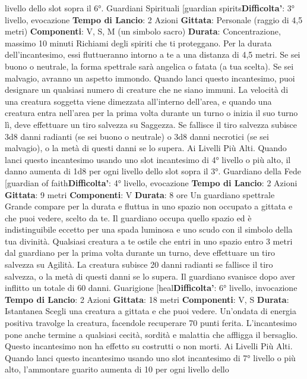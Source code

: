 \begin{multicols}{2}
livello dello slot sopra il 6°.
Guardiani Spirituali
[guardian spirits\textbf{Difficolta'}:
3° livello, evocazione
\textbf{Tempo di Lancio}: 2 Azioni
\textbf{Gittata}: Personale (raggio di 4,5 metri)
\textbf{Componenti}: V, S, M (un simbolo sacro)
\textbf{Durata}: Concentrazione, massimo 10 minuti
Richiami degli spiriti che ti proteggano. Per la durata
dell’incantesimo, essi fluttueranno intorno a te a una
distanza di 4,5 metri. Se sei buono o neutrale, la forma
spettrale sarà angelica o fatata (a tua scelta). Se sei
malvagio, avranno un aspetto immondo.
Quando lanci questo incantesimo, puoi designare un
qualsiasi numero di creature che ne siano immuni. La
velocità di una creatura soggetta viene dimezzata
all’interno dell’area, e quando una creatura entra
nell’area per la prima volta durante un turno o inizia il
suo turno lì, deve effettuare un tiro salvezza su
Saggezza. Se fallisce il tiro salvezza subisce 3d8 danni
radianti (se sei buono o neutrale) o 3d8 danni necrotici
(se sei malvagio), o la metà di questi danni se lo
supera.
Ai Livelli Più Alti. Quando lanci questo incantesimo
usando uno slot incantesimo di 4° livello o più alto, il
danno aumenta di 1d8 per ogni livello dello slot sopra il
3°.
Guardiano della Fede
[guardian of faith\textbf{Difficolta'}:
4° livello, evocazione
\textbf{Tempo di Lancio}: 2 Azioni
\textbf{Gittata}: 9 metri
\textbf{Componenti}: V
\textbf{Durata}: 8 ore
Un guardiano spettrale Grande compare per la durata e
fluttua in uno spazio non occupato a gittata e che puoi
vedere, scelto da te. Il guardiano occupa quello spazio
ed è indistinguibile eccetto per una spada luminosa e
uno scudo con il simbolo della tua divinità.
Qualsiasi creatura a te ostile che entri in uno spazio
entro 3 metri dal guardiano per la prima volta durante
un turno, deve effettuare un tiro salvezza su Agilità.
La creatura subisce 20 danni radianti se fallisce il tiro
salvezza, o la metà di questi danni se lo supera. Il
guardiano svanisce dopo aver inflitto un totale di 60
danni.
Guarigione
[heal\textbf{Difficolta'}:
6° livello, invocazione
\textbf{Tempo di Lancio}: 2 Azioni
\textbf{Gittata}: 18 metri
\textbf{Componenti}: V, S
\textbf{Durata}: Istantanea
Scegli una creatura a gittata e che puoi vedere.
Un’ondata di energia positiva travolge la creatura,
facendole recuperare 70 punti ferita. L’incantesimo
pone anche termine a qualsiasi cecità, sordità e
malattia che affligga il bersaglio. Questo incantesimo
non ha effetto su costrutti o non morti.
Ai Livelli Più Alti. Quando lanci questo incantesimo
usando uno slot incantesimo di 7° livello o più alto,
l’ammontare guarito aumenta di 10 per ogni livello dello

\end{multicols}
